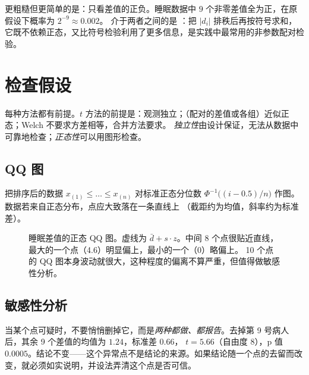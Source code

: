 更粗糙但更简单的是：只看差值的正负。睡眠数据中 $9$ 个非零差值全为正，在原假设下概率为 $2^{-9}\approx0.002$。
介于两者之间的是 ：把 $|d_i|$ 排秩后再按符号求和，它既不依赖正态，又比符号检验利用了更多信息，是实践中最常用的非参数配对检验。

\section{检查假设}

每种方法都有前提。$t$ 方法的前提是：观测独立；（配对的差值或各组）近似正态；Welch 不要求方差相等，合并方法要求。
\emph{独立性}由设计保证，无法从数据中可靠地检查；\emph{正态性}可以用图形检查。

\subsection{QQ 图}

把排序后的数据 $x_{(1)}\le\dots\le x_{(n)}$ 对标准正态分位数 $\Phi^{-1}\big((i-0.5)/n\big)$ 作图。数据若来自正态分布，点应大致落在一条直线上
（截距约为均值，斜率约为标准差）。

\begin{figure}[H]
\centering
{}
\caption{睡眠差值的正态 QQ 图。虚线为 $\bar d+s\cdot z$。中间 8 个点很贴近直线，最大的一个点（4.6）明显偏上，最小的一个（0）略偏上。
10 个点的 QQ 图本身波动就很大，这种程度的偏离不算严重，但值得做敏感性分析。}
\label{fig:qq}
\end{figure}

\subsection{敏感性分析}

当某个点可疑时，不要悄悄删掉它，而是\emph{两种都做、都报告}。去掉第 9 号病人后，其余 9 个差值的均值为 $1.24$，标准差 $0.66$，
$t=5.66$（自由度 8），p 值 $0.0005$。结论不变——这个异常点不是结论的来源。如果结论随一个点的去留而改变，就必须如实说明，并设法弄清这个点是否可信。

